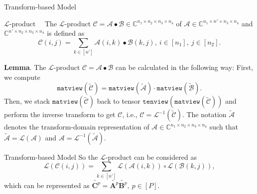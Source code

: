 \documentclass[t, 10pt, handout, aspectratio=169]{beamer}
\begin{document}
\begin{frame}{Transform-based Model}
\begin{block}{$\mathcal{L}$-product}
~~The $\mathcal{L}$-product $\mathcal{C}=\mathcal{A}\bullet\mathcal{B}\in\mathbb{C}^{n_1\times n_2\times n_3\times n_4}$ of $\mathcal{A}\in \mathbb{C}^{n_1\times n'\times n_3\times n_4}$ and $\mathbb{C}^{n'\times n_2\times n_3\times n_4}$ is defined as
$$
\mathcal{C}(i,j)=\sum_{k\in[n']}\mathcal{A}(i,k)\bullet\mathcal{B}(k,j), ~i\in[n_1], ~j\in[n_2].
$$
\end{block}
\textbf{Lemma}. The $\mathcal{L}$-product $\mathcal{C}=\mathcal{A}\bullet\mathcal{B}$ can be calculated in the following way: First, we compute
$$
\texttt{matview}(\widetilde{\mathcal{C}})=\texttt{matview}(\widetilde{\mathcal{A}})\cdot\texttt{matview}(\widetilde{\mathcal{B}}).
$$
Then, we stack $\texttt{matview}(\widetilde{\mathcal{C}})$ back to tensor $\texttt{tenview}(\texttt{matview}(\widetilde{\mathcal{C}}))$ and perform the inverse transform to get $\mathcal{C}$, i.e., $\mathcal{C}=\mathcal{L}^{-1}(\widetilde{\mathcal{C}})$. The notation $\widetilde{\mathcal{A}}$ denotes the transform-domain representation of $\mathcal{A}\in\mathbb{C}^{n_1\times n_2\times n_3\times n_4}$ such that $\widetilde{\mathcal{A}}=\mathcal{L}(\mathcal{A})$ and $\mathcal{A}=\mathcal{L}^{-1}(\widetilde{\mathcal{A}})$.

\end{frame}

\begin{frame}{Transform-based Model}
So the $\mathcal{L}$-product can be considered as
$$
\mathcal{L}(\mathcal{C}(i,j))=\sum_{k\in[n']}\mathcal{L}(\mathcal{A}(i,k))\circ\mathcal{L}(\mathcal{B}(k,j)),
$$
which can be represented as $\widetilde{\mathbf{C}^p}=\widetilde{\mathbf{A}^p}\widetilde{\mathbf{B}^p}, ~p\in[P]$.
\end{frame}
\end{document}
